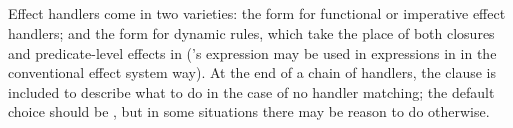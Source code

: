\begin{bnf*}
     \\
     \\
     \\
     \\
     \\
     \\
     \\
     \\
     \\
\end{bnf*}

Effect handlers come in two varieties: the  form for functional
or imperative effect handlers; and the  form for dynamic rules,
which take the place of both closures and predicate-level effects in \Law{}
(\Poetry{}'s  expression may be used in expressions in \Law{}
in the conventional effect system way). At the end of a chain of handlers,
the  clause is included to describe what to do in the case of no
handler matching; the default choice should be , but in some
situations there may be reason to do otherwise.

